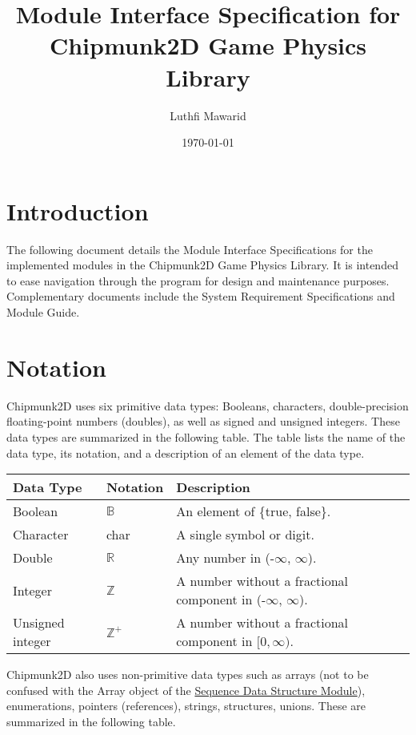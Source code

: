 \documentclass[12pt]{article}
\newcommand{\progname}{Chipmunk2D }
\newcommand{\Sequence}{\hyperref[MISSequence]{Sequence Data Structure Module}}
\begin{document}
\title{Module Interface Specification for Chipmunk2D Game Physics Library} \author{Luthfi Mawarid}
\date{\today}

\maketitle

\tableofcontents

\section{Introduction} \label{SecIntro}

The following document details the Module Interface
Specifications for the implemented modules in the \progname Game Physics Library.  It is intended to ease navigation through the program for design and
maintenance purposes.  Complementary documents include the System
Requirement Specifications and Module Guide.

\section{Notation} \label{SecNotation}

\progname uses six primitive data types: Booleans, characters, double-precision floating-point numbers (doubles), as well as signed and unsigned integers. These data types are summarized in the following table. The table lists the name of the 
data type, its notation, and a description of an element of the data type. 

\renewcommand*{\arraystretch}{1.2}
\noindent  \begin{longtable}{l l p{10.5cm}} 
\toprule 
\textbf{Data Type} & \textbf{Notation} & \textbf{Description} \\ 
\midrule
Boolean & $\mathbb{B}$ & An element of \{true, false\}. \\
Character & char & A single symbol or digit. \\
Double & $\mathbb{R}$ & Any number in (-$\infty$, $\infty$). \\
Integer & $\mathbb{Z}$ & A number without a fractional
  component in (-$\infty$, $\infty$). \\
Unsigned integer & $\mathbb{Z}^+$ & A number without a fractional
  component in $[0, \infty)$. \\
\bottomrule
\end{longtable} 

\noindent \progname also uses non-primitive data types such as arrays (not to be confused with the Array object of the \Sequence), enumerations, pointers (references), strings, structures, unions. These are summarized in the following table.
\end{document}
